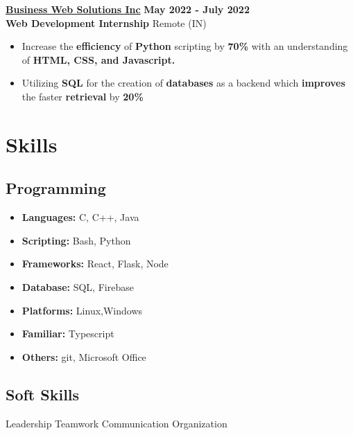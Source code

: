 \documentclass[]{article}
\newenvironment{tightemize}{
\vspace{-\topsep}\begin{itemize}\itemsep1pt \parskip1pt \parsep0pt}
{\end{itemize}\vspace{-\topsep}}
\newcommand{\company}[2]{
  {\Large{{#1}}
  \hfill \footnotesize{#2}}
}
\newcommand{\role}[2]{
  {\large {{#1}}
    \hfill \small{#2}
  }
}
\begin{document}
\begin{multicols}{2}
\begin{flushleft}
    \company{\textbf{\href{https://www.businesswebsolutions.in/}{Business Web Solutions Inc}}} {\textbf{May 2022 - July 2022}} \\
    \role{\textbf{Web Development Internship}}{Remote (IN)}
    \begin{tightemize}
      \item { Increase the \textbf{efficiency} of \textbf{Python} scripting by \textbf{70\%} with
      an understanding of \textbf{ HTML, CSS, and Javascript.}}
      \item {Utilizing \textbf{SQL} for the creation of \textbf{databases} as a
      backend which \textbf{improves} the faster \textbf{retrieval} by \textbf{20\%}} 
    \end{tightemize}


    \section*{Skills} 
    \subsection*{Programming \\} 
    \begin{tightemize}
      \item \textbf{Languages:} C, C++, Java
      \item \textbf{Scripting:} Bash, Python
      \item \textbf{Frameworks:} React, Flask, Node
      \item \textbf{Database:} SQL, Firebase
      \item \textbf{Platforms:} Linux,Windows
      \item \textbf{Familiar:} Typescript
      \item \textbf{Others:} git, Microsoft Office
    \end{tightemize}

    \subsection*{Soft Skills}
    Leadership \textbullet{} Teamwork \textbullet{} Communication \textbullet{} Organization





\end{flushleft}
\end{multicols}
\end{document}
